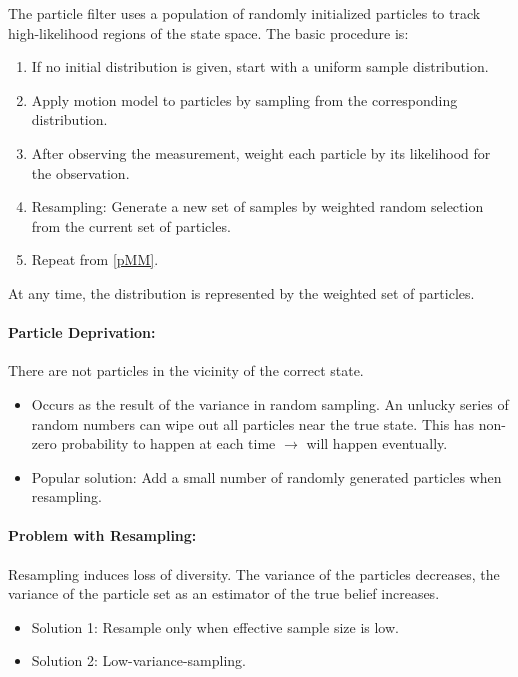 \begin{multicols*}{2}
The particle filter uses a population of randomly initialized particles to track high-likelihood regions of the state space.
The basic procedure is:
\begin{enumerate}
	\item If no initial distribution is given, start with a uniform sample distribution.
	\item Apply motion model to particles by sampling from the corresponding distribution. \label{pMM}
	\item After observing the measurement, weight each particle by its likelihood for the observation.
	\item Resampling: Generate a new set of samples by weighted random selection from the current set of particles.
	\item Repeat from \ref{pMM}.
\end{enumerate}
At any time, the distribution is represented by the weighted set of particles.

\paragraph{Particle Deprivation:} There are not particles in the vicinity of the correct state.
\begin{itemize}
	\item Occurs as the result of the variance in random sampling.
	An unlucky series of random numbers can wipe out all particles near the true state.
	This has non-zero probability to happen at each time $\rightarrow$ will happen eventually.
	\item Popular solution: Add a small number of randomly generated particles when resampling.
\end{itemize}

\paragraph{Problem with Resampling:}
Resampling induces loss of diversity.
The variance of the particles decreases, the variance of the particle set as an estimator of the true belief increases.
\begin{itemize}
	\item Solution 1: Resample only when effective sample size is low.
	\item Solution 2: Low-variance-sampling.
\end{itemize}


\end{multicols*}
